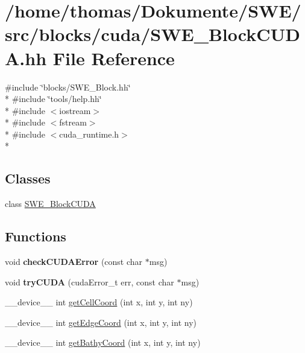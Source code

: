 \hypertarget{SWE__BlockCUDA_8hh}{\section{/home/thomas/\-Dokumente/\-S\-W\-E/src/blocks/cuda/\-S\-W\-E\-\_\-\-Block\-C\-U\-D\-A.hh File Reference}
\label{SWE__BlockCUDA_8hh}
}
{\ttfamily \#include \char`\"{}blocks/\-S\-W\-E\-\_\-\-Block.\-hh\char`\"{}}\\*
{\ttfamily \#include \char`\"{}tools/help.\-hh\char`\"{}}\\*
{\ttfamily \#include $<$iostream$>$}\\*
{\ttfamily \#include $<$fstream$>$}\\*
{\ttfamily \#include $<$cuda\-\_\-runtime.\-h$>$}\\*
\subsection*{Classes}
\begin{DoxyCompactItemize}
\item 
class \hyperlink{classSWE__BlockCUDA}{S\-W\-E\-\_\-\-Block\-C\-U\-D\-A}
\end{DoxyCompactItemize}
\subsection*{Functions}
\begin{DoxyCompactItemize}
\item 
\hypertarget{SWE__BlockCUDA_8hh_a3b360c7adecc62da0141b3c82e753c77}{void {\bfseries check\-C\-U\-D\-A\-Error} (const char $\ast$msg)}\label{SWE__BlockCUDA_8hh_a3b360c7adecc62da0141b3c82e753c77}

\item 
\hypertarget{SWE__BlockCUDA_8hh_a0cda924127c6de7246554ed6b80917e5}{void {\bfseries try\-C\-U\-D\-A} (cuda\-Error\-\_\-t err, const char $\ast$msg)}\label{SWE__BlockCUDA_8hh_a0cda924127c6de7246554ed6b80917e5}

\item 
\-\_\-\-\_\-device\-\_\-\-\_\- int \hyperlink{SWE__BlockCUDA_8hh_a851d73679072ec13f3e3a9bd9dd4ddcc}{get\-Cell\-Coord} (int x, int y, int ny)
\item 
\-\_\-\-\_\-device\-\_\-\-\_\- int \hyperlink{SWE__BlockCUDA_8hh_acbd2e57b95983dbef453451ff7ddf9bb}{get\-Edge\-Coord} (int x, int y, int ny)
\item 
\-\_\-\-\_\-device\-\_\-\-\_\- int \hyperlink{SWE__BlockCUDA_8hh_add74cf6e6e3f322a5948a74fc7183cde}{get\-Bathy\-Coord} (int x, int y, int ny)
\end{DoxyCompactItemize}
